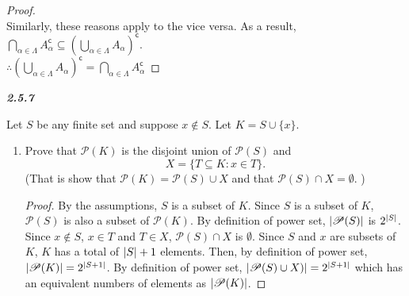 \documentclass{article}
\let\euscr\mathscr
\DeclarePairedDelimiter\abs{\lvert}{\rvert}%
\begin{document}
\begin{enumerate}
\begin{flushleft}
\begin{enumerate}
\begin{proof}
					\\ \vspace{1mm}
					Similarly, these reasons apply to the vice versa. As a result, $\bigcap\limits_{\alpha \in \Lambda} A_\alpha^\mathsf{c} \subseteq (\bigcup\limits_{\alpha \in \Lambda} A_\alpha)^\mathsf{c}$.
					\\ $\therefore (\bigcup\limits_{\alpha \in \Lambda} A_\alpha)^\mathsf{c} = \bigcap\limits_{\alpha \in \Lambda} A_\alpha^\mathsf{c}$
				\end{proof}
			\end{enumerate}
		\end{flushleft}
		\textbf{\textit{2.5.7}}
		\begin{flushleft}
			Let $S$ be any finite set and suppose $x \notin S$. Let $K = S \cup \{x\}$.
			\begin{enumerate}
				\item Prove that $\euscr{P}(K)$ is the disjoint union of $\euscr{P}(S)$ and
				\[X = \{T \subseteq K : x  \in T\}.\]
				(That is show that $\euscr{P}(K) = \euscr{P}(S) \cup X$ and that $\euscr{P}(S) \cap X = \emptyset$. ) \\
				\begin{proof}
					By the assumptions, $S$ is a subset of $K$. Since $S$ is a subset of $K$, $\euscr{P}(S)$ is also a subset of $\euscr{P}(K)$. By definition of power set, $\abs{\euscr{P}(S)}$ is $2^{\abs{S}}$. Since $x \notin S$, $x \in T$ and $T \in X$, $\euscr{P}(S) \cap X$ is $\emptyset$. Since $S$ and $x$ are subsets of $K$, $K$ has a total of $\abs{S} + 1$ elements. Then, by definition of power set, $\abs{\euscr{P}(K)} = 2^{\abs{S+1}}$. By definition of power set, $\abs{\euscr{P}(S) \cup X)}= 2^{\abs{S+1}}$ which has an equivalent numbers of elements as $\abs{\euscr{P}(K)}$.
				\end{proof}
				
			\end{enumerate}
		\end{flushleft}
	\end{enumerate}
\end{document}
